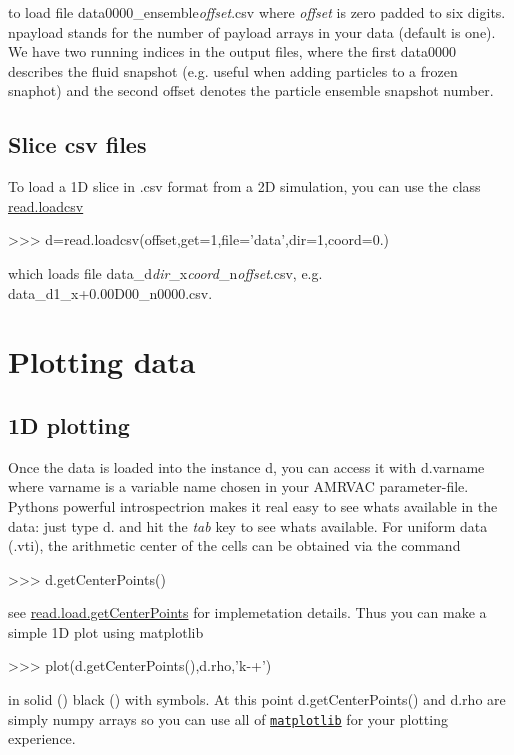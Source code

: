  to load file {\ttfamily data0000\+\_\+ensemble}{\itshape offset}{\ttfamily .csv} where {\itshape offset} is zero padded to six digits. {\ttfamily npayload} stands for the number of payload arrays in your data (default is one). We have two running indices in the output files, where the first {\ttfamily data0000} describes the fluid snapshot (e.\+g. useful when adding particles to a frozen snaphot) and the second {\ttfamily offset} denotes the particle ensemble snapshot number.\hypertarget{index_slice}{}\subsection{Slice csv files}\label{index_slice}
To load a 1D slice in {\ttfamily .csv} format from a 2D simulation, you can use the class \hyperlink{classread_1_1loadcsv}{read.\+loadcsv} 
\begin{DoxyCode}
>>> d=read.loadcsv(offset,get=1,file='data',dir=1,coord=0.)
\end{DoxyCode}
 which loads file {\ttfamily data\+\_\+d}{\itshape dir}{\ttfamily \+\_\+x}{\itshape coord}\+\_\+n{\itshape offset}{\ttfamily .csv}, e.\+g. {\ttfamily data\+\_\+d1\+\_\+x+0.00\+D00\+\_\+n0000.\+csv}.\hypertarget{index_plotting}{}\section{Plotting data}\label{index_plotting}
\hypertarget{index_onedplots}{}\subsection{1\+D plotting}\label{index_onedplots}
Once the data is loaded into the instance {\ttfamily d}, you can access it with {\ttfamily d.\+varname} where {\ttfamily varname} is a variable name chosen in your A\+M\+R\+V\+AC parameter-\/file. Pythons powerful introspectrion makes it real easy to see whats available in the data\+: just type {\ttfamily d.} and hit the {\itshape tab} key to see whats available. For uniform data ({\ttfamily .vti}), the arithmetic center of the cells can be obtained via the command 
\begin{DoxyCode}
>>> d.getCenterPoints()
\end{DoxyCode}
 see \hyperlink{classread_1_1load_abd18004cdc081e7244548387dc7f6b4c}{read.\+load.\+get\+Center\+Points} for implemetation details. Thus you can make a simple 1D plot using matplotlib 
\begin{DoxyCode}
>>> plot(d.getCenterPoints(),d.rho,'k-+')
\end{DoxyCode}
 in solid (\textquotesingle{}{\ttfamily -\/}\textquotesingle{}) black (\textquotesingle{}) with \textquotesingle{}{\ttfamily +}\textquotesingle{} symbols. At this point {\ttfamily d.\+get\+Center\+Points()} and {\ttfamily d.\+rho} are simply numpy arrays so you can use all of \href{http://matplotlib.org/contents.html}{\tt matplotlib} for your plotting experience.

